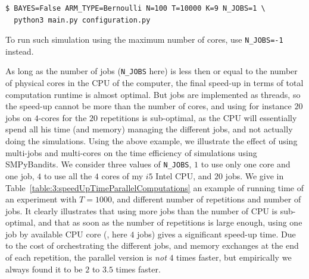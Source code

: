 \begin{small}
    \begin{listing}[h!]
        \begin{verbatim}
$ BAYES=False ARM_TYPE=Bernoulli N=100 T=10000 K=9 N_JOBS=1 \
  python3 main.py configuration.py
        \end{verbatim}
        \caption{To run such simulation using the maximum number of cores, use \texttt{N\_JOBS=-1} instead.}
        \label{lst:3:runOneCoreOrMore}
    \end{listing}
\end{small}

As long as the number of jobs (\texttt{N\_JOBS} here) is less then or equal to the number of physical cores in the CPU of the computer, the final speed-up in terms of total computation runtime is almost optimal.
But jobs are implemented as threads, so the speed-up cannot be more than the number of cores, and using for instance $20$ jobs on $4$-cores for the $20$ repetitions is sub-optimal, as the CPU will essentially spend all his time (and memory) managing the different jobs, and not actually doing the simulations.
Using the above example, we illustrate the effect of using multi-jobs and multi-cores on the time efficiency of simulations using SMPyBandits. We consider three values of \texttt{N\_JOBS}, $1$ to use only one core and one job, $4$ to use all the $4$ cores of my $i5$ Intel CPU, and $20$ jobs.
We give in Table~\ref{table:3:speedUpTimeParallelComputations} an example of running time of an experiment with $T=1000$, and different number of repetitions and number of jobs.
It clearly illustrates that using more jobs than the number of CPU is sub-optimal, and that as soon as the number of repetitions is large enough, using one job by available CPU core (\ie, here $4$ jobs) gives a significant speed-up time.
Due to the cost of orchestrating the different jobs, and memory exchanges at the end of each repetition, the parallel version is \emph{not} $4$ times faster, but empirically we always found it to be $2$ to $3.5$ times faster.


